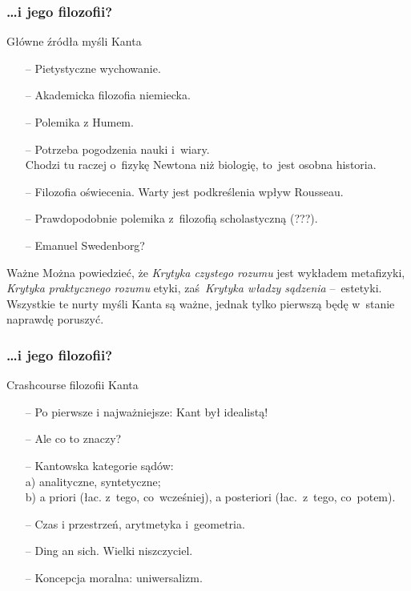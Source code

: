 \documentclass{beamer}  %
\begin{document}
\begin{frame}
  \frametitle{\ldots i jego filozofii?}

  \begin{block}{Główne źródła myśli Kanta}
    \begin{itemize}
    \item[--] Pietystyczne wychowanie.
    \item[--] Akademicka filozofia niemiecka.
    \item[--] Polemika z Humem.
    \item[--] Potrzeba pogodzenia nauki i~wiary. \\
      Chodzi tu raczej o~fizykę Newtona niż biologię, to~jest osobna
      historia.
    \item[--] Filozofia oświecenia. Warty jest podkreślenia wpływ
      Rousseau.
    \item[--] Prawdopodobnie polemika z~filozofią scholastyczną (???).
    \item[--] Emanuel Swedenborg?
    \end{itemize}
  \end{block}

  \begin{block}{Ważne}
    Można powiedzieć, że \emph{Krytyka czystego rozumu} jest wykładem
    metafizyki, \emph{Krytyka praktycznego rozumu} etyki,
    zaś~\emph{Krytyka władzy sądzenia} --~estetyki. Wszystkie te nurty
    myśli Kanta są ważne, jednak tylko pierwszą będę w~stanie naprawdę
    poruszyć.
  \end{block}
\end{frame}



\begin{frame}
  \frametitle{\ldots i jego filozofii?}

  \begin{block}{Crashcourse filozofii Kanta}
    \begin{itemize}
      \pause
    \item[--] Po pierwsze i najważniejsze: Kant był idealistą!
    \item[--] Ale co to znaczy?
    \item[--] Kantowska kategorie sądów: \\
      a) analityczne, syntetyczne; \\
      b) a priori (łac. z~tego, co~wcześniej), a posteriori
      (łac.~z~tego, co~potem).
    \item[--] Czas i przestrzeń, arytmetyka i~geometria.
    \item[--] Ding an sich. Wielki niszczyciel.
    \item[--] Koncepcja moralna: uniwersalizm.
    \end{itemize}
  \end{block}
\end{frame}
\end{document}
